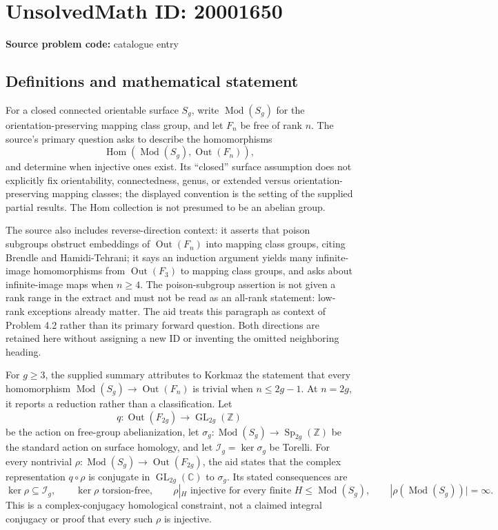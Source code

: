 \documentclass[11pt]{article}
\newcommand{\Z}{\mathbb{Z}}
\newcommand{\C}{\mathbb{C}}
\begin{document}
\section*{UnsolvedMath ID: 20001650}
\textbf{Source problem code:} catalogue entry
\subsection{Definitions and mathematical statement}
For a closed connected orientable surface $S_g$, write $\operatorname{Mod}(S_g)$ for the orientation-preserving mapping class group, and let $F_n$ be free of rank $n$. The source's primary question asks to describe the homomorphisms
\[
 \operatorname{Hom}(\operatorname{Mod}(S_g),\operatorname{Out}(F_n)),
\]
and determine when injective ones exist. Its ``closed'' surface assumption does not explicitly fix orientability, connectedness, genus, or extended versus orientation-preserving mapping classes; the displayed convention is the setting of the supplied partial results. The Hom collection is not presumed to be an abelian group.

The source also includes reverse-direction context: it asserts that poison subgroups obstruct embeddings of $\operatorname{Out}(F_n)$ into mapping class groups, citing Brendle and Hamidi-Tehrani; it says an induction argument yields many infinite-image homomorphisms from $\operatorname{Out}(F_3)$ to mapping class groups, and asks about infinite-image maps when $n\geq4$. The poison-subgroup assertion is not given a rank range in the extract and must not be read as an all-rank statement: low-rank exceptions already matter. The aid treats this paragraph as context of Problem 4.2 rather than its primary forward question. Both directions are retained here without assigning a new ID or inventing the omitted neighboring heading.

For $g\geq3$, the supplied summary attributes to Korkmaz the statement that every homomorphism $\operatorname{Mod}(S_g)\to\operatorname{Out}(F_n)$ is trivial when $n\leq2g-1$. At $n=2g$, it reports a reduction rather than a classification. Let
\[
 q:\operatorname{Out}(F_{2g})\to\operatorname{GL}_{2g}(\Z)
\]
be the action on free-group abelianization, let $\sigma_g:\operatorname{Mod}(S_g)\to\operatorname{Sp}_{2g}(\Z)$ be the standard action on surface homology, and let $\mathcal I_g=\ker\sigma_g$ be Torelli. For every nontrivial $\rho:\operatorname{Mod}(S_g)\to\operatorname{Out}(F_{2g})$, the aid states that the complex representation $q\circ\rho$ is conjugate in $\operatorname{GL}_{2g}(\C)$ to $\sigma_g$. Its stated consequences are
\[
 \ker\rho\subseteq\mathcal I_g,\qquad\ker\rho\text{ torsion-free},
 \qquad\rho|_H\text{ injective for every finite }H\leq\operatorname{Mod}(S_g),
 \qquad|\rho(\operatorname{Mod}(S_g))|=\infty.
\]
This is a complex-conjugacy homological constraint, not a claimed integral conjugacy or proof that every such $\rho$ is injective.
\end{document}
